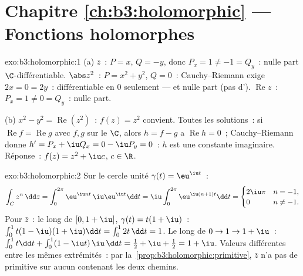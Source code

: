 \section*{Chapitre \ref{ch:b3:holomorphic} --- Fonctions
holomorphes}

\begin{solution}{exo:b3:holomorphic:1}
(a) $\bar z$~: $P = x$, $Q = -y$, donc $P_x = 1 \neq -1 =
Q_y$~: nulle part $\C$-différentiable. $\abs z^2$~: $P = x^2
+ y^2$, $Q = 0$~: Cauchy--Riemann exige $2x = 0 = 2y$~:
différentiable en $0$ seulement --- et  nulle part
(pas d'). $\operatorname{Re}z$~: $P_x = 1 \neq 0 =
Q_y$~: nulle part.

(b) $x^2 - y^2 = \operatorname{Re}(z^2)$~: $f(z) = z^2$
convient. Toutes les solutions~: si $\operatorname{Re}f =
\operatorname{Re}g$ avec $f, g$  sur le 
$\C$, alors $h = f - g$ a $\operatorname{Re}h = 0$~;
Cauchy--Riemann donne $h' = P_x + \iu Q_x = 0 - \iu P_y =
0$~: $h$ est une constante imaginaire. Réponse~: $f(z) =
z^2 + \iu c$, $c \in \R$.
\end{solution}

\begin{solution}{exo:b3:holomorphic:2}
Sur le cercle unité $\gamma(t) = \eu^{\iu t}$~:
\[
\int_C z^n\,\dd z = \int_0^{2\pi}\eu^{\iu nt}\,\iu\eu^{\iu
t}\dd t = \iu\int_0^{2\pi}\eu^{\iu(n+1)t}\dd t
= \begin{cases} 2\iu\pi & n = -1,\\ 0 & n \neq -1.\end{cases}
\]
Pour $\bar z$~: le long de $[0, 1+\iu]$, $\gamma(t) = t(1 +
\iu)$~: $\int_0^1 t(1 - \iu)(1 + \iu)\dd t = \int_0^12t\,\dd
t = 1$. Le long de $0 \to 1 \to 1 + \iu$~: $\int_0^1t\dd t +
\int_0^1(1 - \iu t)\,\iu\,\dd t = \frac12 + \iu + \frac12 = 1
+ \iu$. Valeurs différentes entre les mêmes extrémités~: par
la~\cref{prop:b3:holomorphic:primitive}, $\bar z$ n'a pas de
primitive sur aucun  contenant les deux chemins.
\end{solution}

